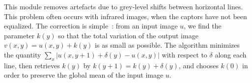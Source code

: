 This module removes artefacts due to grey-level shifts between horizontal lines. This problem often occurs with infrared images, when the captors have not been equalized. The correction is simple~: from an input image $u$, we find the parameter $k(y)$ so that the total variation of the output image $v(x,y)=u(x,y)+k(y)$ is as small as possible. The algorithm minimizes the quantity $\sum_x |u(x,y+1)+\delta(y)-u(x,y)|$ with respect to $\delta$ along each line, then retrieves $k(y)$ by $k(y+1)=k(y)+\delta(y)$, and chooses $k(0)$ in order to preserve the global mean of the input image $u$.
